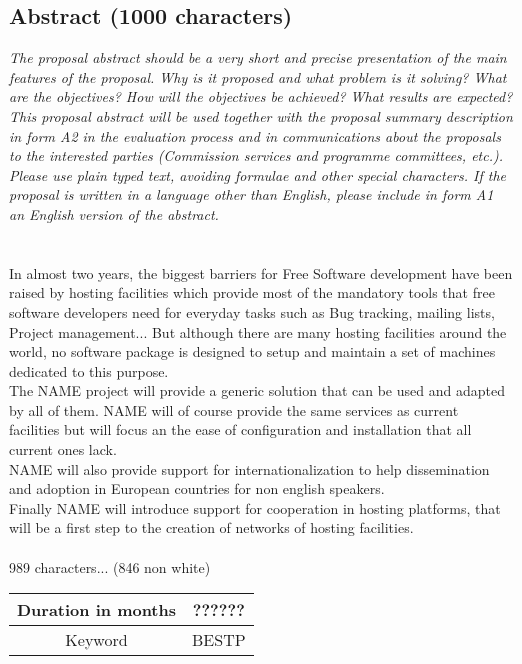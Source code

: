 \documentclass[a4paper,11pt]{report}
\begin{document}
\subsection*{Abstract (1000 characters)}
\textit{The proposal abstract should be a very short and precise presentation
of the main features of the proposal. Why is it proposed and what problem is it
solving? What are the objectives? How will the objectives be achieved? What
results are expected? This proposal abstract will be used together with the
proposal summary description in form A2 in the evaluation process and in
communications about the proposals to the interested parties (Commission
services and programme committees, etc.). Please use plain typed text, avoiding
formulae and other special characters. If the proposal is written in a language
other than English, please include in form A1 an English version of the
abstract.} \\ \\ \\
In almost two years, the biggest barriers for Free Software development have
been raised by hosting facilities which provide most of the mandatory tools
that free software developers need for everyday tasks such as Bug tracking,
mailing lists, Project management... But although there are many hosting
facilities around the world, no software package is designed to setup and
maintain a set of machines dedicated to this purpose. \\ 
The NAME project will provide a generic solution that can be used and adapted
by all of them.  NAME will of course provide the same services as current
facilities but will focus an the ease of configuration and installation that
all current ones lack. \\
NAME will also provide support for internationalization to help dissemination
and adoption in European countries for non english speakers.\\ Finally NAME
will introduce support for cooperation in hosting platforms, that will be a
first step to the creation of networks of hosting facilities. 
\\ \\ 
989 characters... (846 non white) \\
\begin{tabular}{|c|c|}
\hline
Duration in months & ?????? \\ \hline
Keyword & BESTP \\ \hline
\end{tabular}
\end{document}
